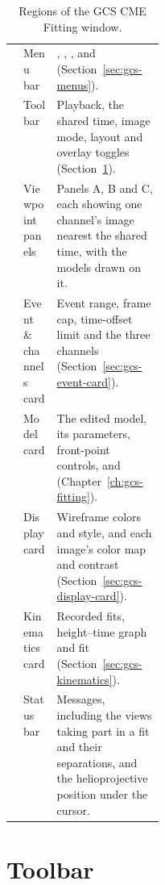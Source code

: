 
\begin{table}[!htbp]
  \centering
  \caption{Regions of the GCS CME Fitting window.}
  \label{tab:gcs-regions}
  \small
  \begin{tabularx}{\linewidth}{@{}cP{0.22\linewidth}L@{}}
    \toprule
     &  &  \\
    \midrule
     & Menu bar & , , ,  and  (Section~\ref{sec:gcs-menus}). \\
     & Toolbar & Playback, the shared time, image mode, layout and overlay toggles (Section~\ref{sec:gcs-toolbar}). \\
     & Viewpoint panels & Panels A, B and C, each showing one channel's image nearest the shared time, with the models drawn on it. \\
     & Event \& channels card & Event range, frame cap, time-offset limit and the three channels (Section~\ref{sec:gcs-event-card}). \\
     & Model card & The edited model, its parameters, front-point controls,  and  (Chapter~\ref{ch:gcs-fitting}). \\
     & Display card & Wireframe colors and style, and each image's color map and contrast (Section~\ref{sec:gcs-display-card}). \\
     & Kinematics card & Recorded fits, height--time graph and fit (Section~\ref{sec:gcs-kinematics}). \\
     & Status bar & Messages, including the views taking part in a fit and their separations, and the helioprojective position under the cursor. \\
    \bottomrule
  \end{tabularx}
\end{table}

\section{Toolbar}
\label{sec:gcs-toolbar}

